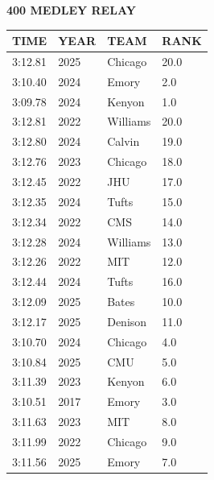 \begin{table}[H]
\centering
\begin{minipage}[t]{0.6\textwidth}
\centering
\textbf{400 MEDLEY RELAY}\\[0.1cm]
\begin{tabular}{@{}p{1.8cm}p{1.2cm}p{1.4cm}p{0.8cm}@{}}
\hline
    \textbf{TIME} & \textbf{YEAR} & \textbf{TEAM} & \textbf{RANK} \\
\hline
    3:12.81 & 2025 & Chicago & 20.0 \\
    3:10.40 & 2024 & Emory & 2.0 \\
    3:09.78 & 2024 & Kenyon & 1.0 \\
    3:12.81 & 2022 & Williams & 20.0 \\
    3:12.80 & 2024 & Calvin & 19.0 \\
    3:12.76 & 2023 & Chicago & 18.0 \\
    3:12.45 & 2022 & JHU & 17.0 \\
    3:12.35 & 2024 & Tufts & 15.0 \\
    3:12.34 & 2022 & CMS & 14.0 \\
    3:12.28 & 2024 & Williams & 13.0 \\
    3:12.26 & 2022 & MIT & 12.0 \\
    3:12.44 & 2024 & Tufts & 16.0 \\
    3:12.09 & 2025 & Bates & 10.0 \\
    3:12.17 & 2025 & Denison & 11.0 \\
    3:10.70 & 2024 & Chicago & 4.0 \\
    3:10.84 & 2025 & CMU & 5.0 \\
    3:11.39 & 2023 & Kenyon & 6.0 \\
    3:10.51 & 2017 & Emory & 3.0 \\
    3:11.63 & 2023 & MIT & 8.0 \\
    3:11.99 & 2022 & Chicago & 9.0 \\
    3:11.56 & 2025 & Emory & 7.0 \\
\hline
\end{tabular}
\end{minipage}
\end{table}

